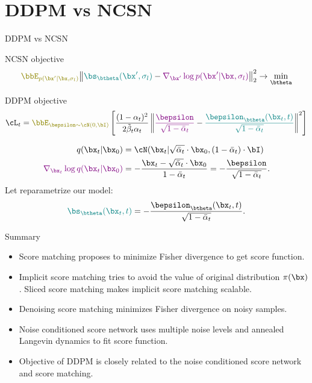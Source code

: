 \section{DDPM vs NCSN}
\begin{frame}{DDPM vs NCSN}
	\begin{block}{NCSN objective}
		\vspace{-0.2cm}
		\[
			{\color{olive}\bbE_{p(\bx' | \bx, \sigma_l)}}\bigl\| {\color{teal}\bs_{\btheta}(\bx', \sigma_l)} - {\color{violet}\nabla_{\bx'} \log p(\bx' | \bx, \sigma_l)} \bigr\|^2_2 \rightarrow \min_{\btheta}
		\]
	\end{block}
	\vspace{-0.3cm}
	\begin{block}{DDPM objective}
		\vspace{-0.2cm}
		\[
			\cL_t = {\color{olive}\bbE_{\bepsilon \sim \cN(0, \bI)}} \left[ \frac{(1 - \alpha_t)^2}{2\tilde{\beta}_t \alpha_t} \left\| {\color{violet}\frac{\bepsilon}{\sqrt{1 - \bar{\alpha}_t}}} - {\color{teal}\frac{\bepsilon_{\btheta}(\bx_t, t)}{\sqrt{1 - \bar{\alpha}_t}}}\right\|^2 \right]
		\]
		\vspace{-0.7cm}
	\end{block}
	\begin{align*}
		q(\bx_t | \bx_0) &= \cN(\bx_t | \sqrt{\bar{\alpha}_t} \cdot \bx_0, (1 - \bar{\alpha}_t) \cdot \bI) \\
		{\color{violet}\nabla_{\bx_t} \log q(\bx_t | \bx_0)} &= - \frac{\bx_t - \sqrt{\bar{\alpha}_t} \cdot \bx_0}{1 - \bar{\alpha}_t} = - \frac{\bepsilon}{\sqrt{1 - \bar{\alpha}_t}}.
	\end{align*}
		Let reparametrize our model: 
		\vspace{-0.2cm}
		\[
			{\color{teal}\bs_{\btheta}(\bx_t, t)} = - \frac{\bepsilon_{\btheta}(\bx_t, t)}{\sqrt{1 - \bar{\alpha}_t}}.
		\]
	\end{frame}
\begin{frame}{Summary}
	\begin{itemize}
		\item Score matching proposes to minimize Fisher divergence to get score function.
		\vfill
		\item Implicit score matching tries to avoid the value of original distribution $\pi(\bx)$. Sliced score matching makes implicit score matching scalable. 
		\vfill
		\item Denoising score matching minimizes Fisher divergence on noisy samples.		
		\vfill
		\item Noise conditioned score network uses multiple noise levels and annealed Langevin dynamics to fit score function.
		\vfill
		\item Objective of DDPM is closely related to the noise conditioned score network and score matching.	
	\end{itemize}
\end{frame}
 